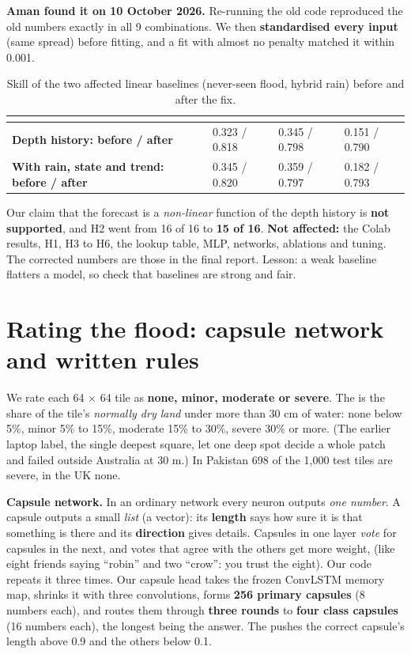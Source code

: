 \textbf{Aman found it on 10 October 2026.} Re-running the old code reproduced the old numbers exactly in all 9 combinations. We then \textbf{standardised every input} (same spread) before fitting, and a fit with almost no penalty matched it within 0.001.

\begin{table}[!htbp]
\centering\small
\caption{Skill of the two affected linear baselines (never-seen flood, hybrid rain) before and after the fix.}
\begin{tabularx}{\linewidth}{|>{\bfseries}p{5.6cm}|Y|Y|Y|}
\hline
{}  &  &  & \\ \hline
Depth history: before / after & 0.323 / 0.818 & 0.345 / 0.798 & 0.151 / 0.790\\ \hline
With rain, state and trend: before / after & 0.345 / 0.820 & 0.359 / 0.797 & 0.182 / 0.793\\ \hline
\end{tabularx}
\end{table}

Our claim that the forecast is a \emph{non-linear} function of the depth history is \textbf{not supported}, and H2 went from 16 of 16 to \textbf{15 of 16}. \textbf{Not affected:} the Colab results, H1, H3 to H6, the lookup table, MLP, networks, ablations and tuning. The corrected numbers are those in the final report. Lesson: a weak baseline flatters a model, so check that baselines are strong and fair.

\section{Rating the flood: capsule network and written rules}\label{ch:capsule}

We rate each 64 $\times$ 64 tile as \textbf{none, minor, moderate or severe}. The  is the share of the tile's \emph{normally dry land} under more than 30 cm of water: none below 5\%, minor 5\% to 15\%, moderate 15\% to 30\%, severe 30\% or more. (The earlier laptop label, the single deepest square, let one deep spot decide a whole patch and failed outside Australia at 30 m.) In Pakistan 698 of the 1,000 test tiles are severe, in the UK none.

\textbf{Capsule network.} In an ordinary network every neuron outputs \emph{one number}. A capsule outputs a small \emph{list} (a vector): its \textbf{length} says how sure it is that something is there and its \textbf{direction} gives details. Capsules in one layer \emph{vote} for capsules in the next, and votes that agree with the others get more weight,  (like eight friends saying ``robin'' and two ``crow'': you trust the eight). Our code repeats it three times. Our capsule head takes the frozen ConvLSTM memory map, shrinks it with three convolutions, forms \textbf{256 primary capsules} (8 numbers each), and routes them through \textbf{three rounds} to \textbf{four class capsules} (16 numbers each), the longest being the answer. The  pushes the correct capsule's length above 0.9 and the others below 0.1.

